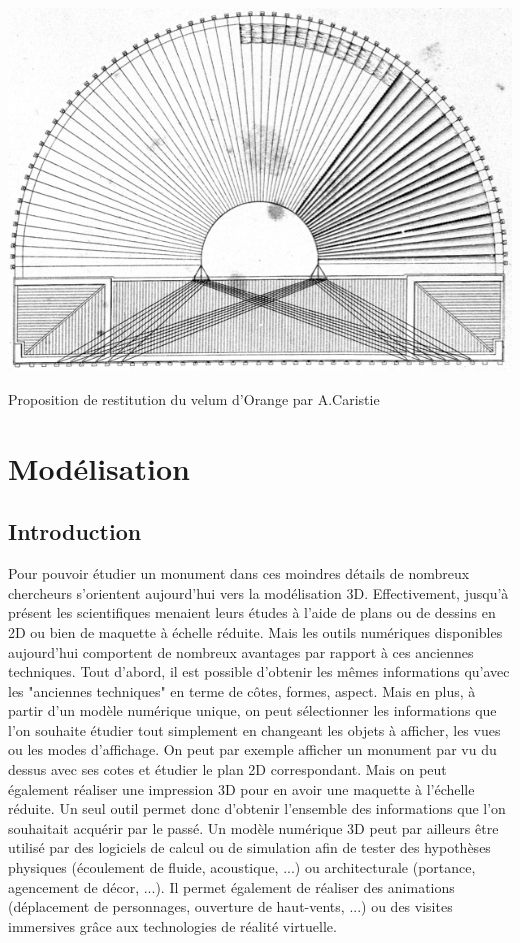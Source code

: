 \begin{figureth}
		\includegraphics[width=\linewidth]{images/velumCaristie}
		\caption[Velum]{Proposition de restitution du velum d'Orange par A.Caristie}
		\label{velumCaristie}
\end{figureth}		




	\chapter{Modélisation}
		\minitoc
		\newpage
		
		\section{Introduction}
		Pour pouvoir étudier un monument dans ces moindres détails de nombreux chercheurs s'orientent aujourd'hui vers la modélisation 3D. Effectivement, jusqu'à présent les scientifiques menaient leurs études à l'aide de plans ou de dessins en 2D ou bien de maquette à échelle réduite. Mais les outils numériques disponibles aujourd'hui comportent de nombreux avantages par rapport à ces anciennes techniques. Tout d'abord, il est possible d'obtenir les mêmes informations qu'avec les "anciennes techniques" en terme de côtes, formes, aspect. Mais en plus, à partir d'un modèle numérique unique, on peut sélectionner les informations que l'on souhaite étudier tout simplement en changeant les objets à afficher, les vues ou les modes d'affichage. On peut par exemple afficher un monument par vu du dessus avec ses cotes et étudier le plan 2D correspondant. Mais on peut également réaliser une impression 3D pour en avoir une maquette à l'échelle réduite. Un seul outil permet donc d'obtenir l'ensemble des informations que l'on souhaitait acquérir par le passé. Un modèle numérique 3D peut par ailleurs être utilisé par des logiciels de calcul ou de simulation afin de tester des hypothèses physiques (écoulement de fluide, acoustique, ...) ou architecturale (portance, agencement de décor, ...). Il permet également de réaliser des animations (déplacement de personnages, ouverture de haut-vents, ...) ou des visites immersives grâce aux technologies de réalité virtuelle. 


